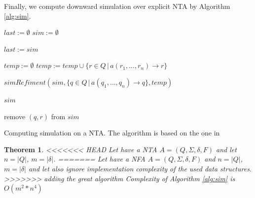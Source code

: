 \documentclass[a4paper, 12pt]{article}
\let\oldnl\nl%
\newcommand{\nonl}{\renewcommand{\nl}{\let\nl\oldnl}}%
\newtheorem{theorem}{Theorem}
\begin{document}
Finally, we compute downward simulation over explicit NTA by Algorithm \ref{alg:sim}.
\begin{algorithm}[h]
\label{alg:sim}
    
	$last := \emptyset $\;
    $sim := \emptyset $\;
	{
		$last := sim$\;
		{
			{
				{
					$temp := \emptyset$\;
					{
						$temp := temp \cup \{r \in Q \,|\, a(r_1,\ldots, r_n) \rightarrow r\}$\;
					}

					$simRefiment(sim, \{q \in Q \,|\, a(q_1,\ldots, q_n) \rightarrow q\}, temp)$\;
				}
			}
		}

	}
	\Return $sim$\;
	\DontPrintSemicolon \nonl\;
	\setcounter{AlgoLine}{0}

	\nonl {}
	{
		{
			{
				{
					remove $(q,r)$ from $sim$ \;
				}
			}
		}
	 }
	 \caption{Computing simulation on a NTA. The algorithm is based on the one in \cite{lengal:trees}}
\end{algorithm}

\begin{theorem}
<<<<<<< HEAD
Let have a NTA $A = (Q, \Sigma, \delta, F)$ and let $n = |Q|$, $m = |\delta|$.
=======
	\label{the:nfacompl}
Let have a NFA $A = (Q, \Sigma, \delta, F)$ and $n = |Q|$, $m = |\delta|$ and let also ignore implementation
complexity of the used data structures.
>>>>>>> adding the great algorithm
Complexity of Algorithm \ref{alg:sim} is $O(m^2*n^4)$
\end{theorem}
\end{document}
